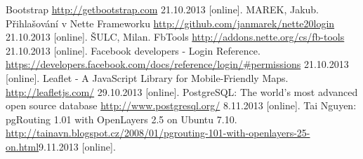 \documentclass[11pt,a4paper,titlepage,oneside]{book}
\begin{document}
\newpage
{}
\begin{thebibliography}{50}
	Bootstrap \url{http://getbootstrap.com} 21.10.2013 [online].
	MAREK, Jakub. Přihlašování v Nette Frameworku \url{http://github.com/janmarek/nette20login} 21.10.2013 [online].
	 ŠULC, Milan. FbTools \url{http://addons.nette.org/cs/fb-tools} 21.10.2013 [online].
	 Facebook developers - Login Reference. \url{https://developers.facebook.com/docs/reference/login/#permissions} 21.10.2013 [online].
		Leaflet - A JavaScript Library for Mobile-Friendly Maps. \url{http://leafletjs.com/} 29.10.2013 [online].
	 PostgreSQL: The world's most advanced open source database \url{http://www.postgresql.org/} 8.11.2013 [online].
	Tai Nguyen: pgRouting 1.01 with OpenLayers 2.5 on Ubuntu 7.10. \url{http://tainavn.blogspot.cz/2008/01/pgrouting-101-with-openlayers-25-on.html}9.11.2013 [online].
\end{thebibliography}
\end{document}
